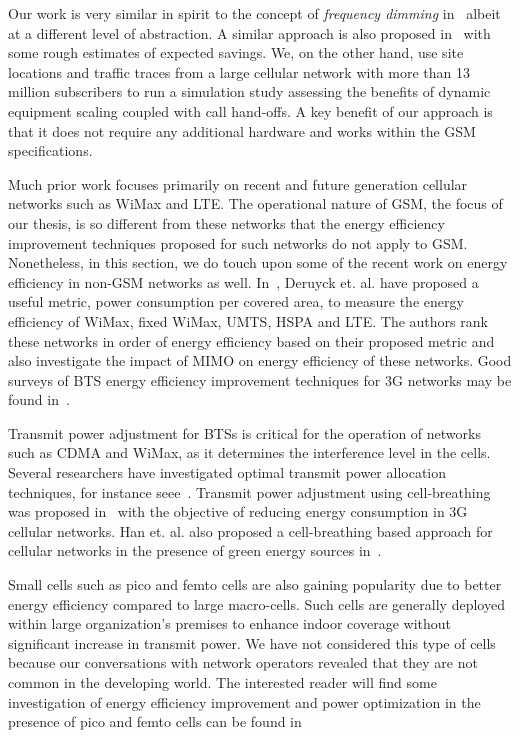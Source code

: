 Our work is very similar in spirit to the concept of
\textit{frequency dimming}
in~\cite{Tipper:Dimming:Globecom:2010} albeit at a different
level of abstraction. A similar approach is also proposed
in~\cite{Blume:2010:BLTJ:CellularPower} with some rough
estimates of expected savings. We, on the other hand, use site
locations and traffic traces from a large cellular network with
more than 13 million subscribers to run a simulation study
assessing the benefits of dynamic equipment scaling coupled
with call hand-offs.
A key benefit of our approach is that it 
does not require any additional hardware
and works within the GSM specifications.

Much prior work focuses primarily on recent and future generation cellular networks such as WiMax and LTE. The operational nature of GSM, the focus of our thesis, is so different from these networks that the energy efficiency improvement techniques proposed for such networks do not apply to GSM. Nonetheless, in this section, we do touch upon some of the recent work on energy efficiency in non-GSM networks as well. In~\cite{Deruyck20112036}, Deruyck et. al. have proposed a useful metric, power consumption per covered area, to measure the energy efficiency of WiMax, fixed WiMax, UMTS, HSPA and LTE. The authors rank these networks in order of energy efficiency based on their proposed metric and also investigate the impact of MIMO on energy efficiency of these networks. Good surveys of BTS energy efficiency improvement techniques for 3G networks may be found in~\cite{6056687,5783984}.

Transmit power adjustment for BTSs is critical for the operation of networks such as CDMA and WiMax, as it determines the interference level in the cells. Several researchers have investigated optimal transmit power allocation techniques, for instance seee~\cite{Kavitha20131373,Xu:powercontrol:2013}. Transmit power adjustment using cell-breathing was proposed in~\cite{Bhaumik:2010:BSC:1851290.1851300} with the objective of reducing energy consumption in 3G cellular networks. Han et. al. also proposed a cell-breathing based approach for cellular networks in the presence of green energy sources in~\cite{6189819}.

Small cells such as pico and femto cells are also gaining popularity due to better energy efficiency compared to large macro-cells. Such cells are generally deployed within large organization's premises to enhance indoor coverage without significant increase in transmit power. We have not considered this type of cells because our conversations with network operators revealed that they are not common in the developing world. The interested reader will find some investigation of energy efficiency improvement and power optimization in the presence of pico and femto cells can be found in~\cite{6576465,6491498} 

